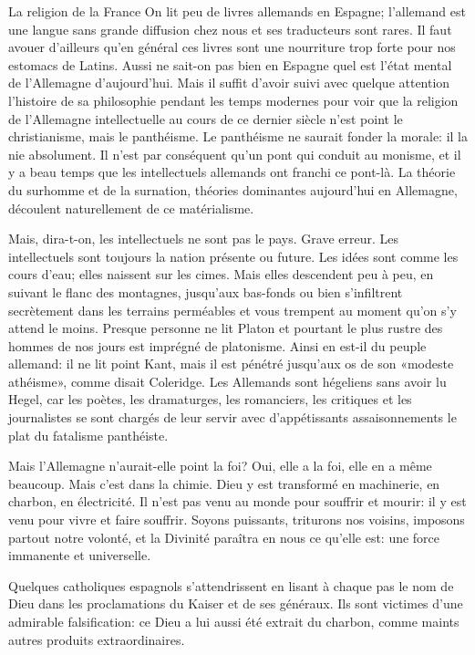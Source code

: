 \begin{chapter}{La religion de la France}
On lit peu de livres allemands en Espagne; l'allemand est une langue
sans grande diffusion chez nous et ses traducteurs sont rares. Il faut
avouer d'ailleurs qu'en général ces livres sont une nourriture trop
forte pour nos estomacs de Latins. Aussi ne sait-on pas bien en Espagne
quel est l'état mental de l'Allemagne d'aujourd'hui. Mais il suffit
d'avoir suivi avec quelque attention l'histoire de sa philosophie
pendant les temps modernes pour voir que la religion de l'Allemagne
intellectuelle au cours de ce dernier siècle n'est point le
christianisme, mais le panthéisme. Le panthéisme ne saurait fonder la
morale: il la nie absolument. Il n'est par conséquent qu'un pont qui
conduit au monisme, et il y a beau temps que les intellectuels allemands
ont franchi ce pont-là. La théorie du surhomme et de la surnation,
théories dominantes aujourd'hui en Allemagne, découlent naturellement de
ce matérialisme.

Mais, dira-t-on, les intellectuels ne sont pas le pays. Grave erreur.
Les intellectuels sont toujours la nation présente ou future. Les idées
sont comme les cours d'eau; elles naissent sur les cimes. Mais elles
descendent peu à peu, en suivant le flanc des montagnes, jusqu'aux
bas-fonds ou bien s'infiltrent secrètement dans les terrains perméables
et vous trempent au moment qu'on s'y attend le moins. Presque personne
ne lit Platon et pourtant le plus rustre des hommes de nos jours est
imprégné de platonisme. Ainsi en est-il du peuple allemand: il ne lit
point Kant, mais il est pénétré jusqu'aux os de son «modeste athéisme»,
comme disait Coleridge. Les Allemands sont hégeliens sans avoir lu
Hegel, car les poètes, les dramaturges, les romanciers, les critiques et
les journalistes se sont chargés de leur servir avec d'appétissants
assaisonnements le plat du fatalisme panthéiste.

Mais l'Allemagne n'aurait-elle point la foi? Oui, elle a la foi, elle en
a même beaucoup. Mais c'est dans la chimie. Dieu y est transformé en
machinerie, en charbon, en électricité. Il n'est pas venu au monde pour
souffrir et mourir: il y est venu pour vivre et faire souffrir. Soyons
puissants, triturons nos voisins, imposons partout notre volonté, et la
Divinité paraîtra en nous ce qu'elle est: une force immanente et
universelle.

Quelques catholiques espagnols s'attendrissent en lisant à chaque pas le
nom de Dieu dans les proclamations du Kaiser et de ses généraux. Ils
sont victimes d'une admirable falsification: ce Dieu a lui aussi été
extrait du charbon, comme maints autres produits extraordinaires.


\end{chapter}
